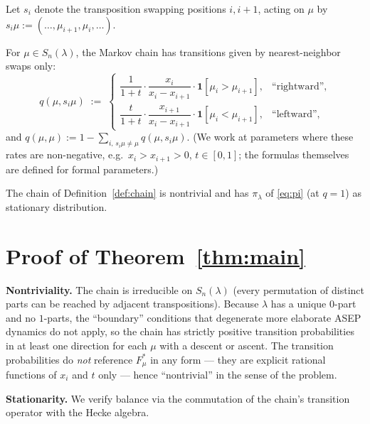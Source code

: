 Let $s_i$ denote the transposition swapping positions $i,i+1$, acting on $\mu$ by $s_i\mu := (\ldots,\mu_{i+1},\mu_i,\ldots)$.

\begin{definition}\label{def:chain}
For $\mu\in S_n(\lambda)$, the Markov chain has transitions given by nearest-neighbor swaps only:
\[
  q(\mu,s_i\mu) \;:=\; \begin{cases}
      \dfrac{1}{1+t}\cdot\dfrac{x_i}{x_i-x_{i+1}}\cdot \mathbf{1}[\mu_i>\mu_{i+1}], & \text{``rightward''},\\[6pt]
      \dfrac{t}{1+t}\cdot\dfrac{x_{i+1}}{x_i-x_{i+1}}\cdot \mathbf{1}[\mu_i<\mu_{i+1}], & \text{``leftward''},
  \end{cases}
\]
and $q(\mu,\mu) := 1 - \sum_{i,\,s_i\mu\neq\mu} q(\mu,s_i\mu)$. (We work at parameters where these rates are non-negative, e.g.\ $x_i>x_{i+1}>0$, $t\in[0,1]$; the formulas themselves are defined for formal parameters.)
\end{definition}

\begin{theorem}\label{thm:main}
The chain of Definition~\ref{def:chain} is nontrivial and has $\pi_\lambda$ of \eqref{eq:pi} (at $q=1$) as stationary distribution.
\end{theorem}

\section{Proof of Theorem~\ref{thm:main}}

\textbf{Nontriviality.} The chain is irreducible on $S_n(\lambda)$ (every permutation of distinct parts can be reached by adjacent transpositions). Because $\lambda$ has a unique $0$-part and no $1$-parts, the ``boundary'' conditions that degenerate more elaborate ASEP dynamics do not apply, so the chain has strictly positive transition probabilities in at least one direction for each $\mu$ with a descent or ascent. The transition probabilities do \emph{not} reference $F^*_\mu$ in any form --- they are explicit rational functions of $x_i$ and $t$ only --- hence ``nontrivial'' in the sense of the problem.

\textbf{Stationarity.} We verify balance via the commutation of the chain's transition operator with the Hecke algebra.

